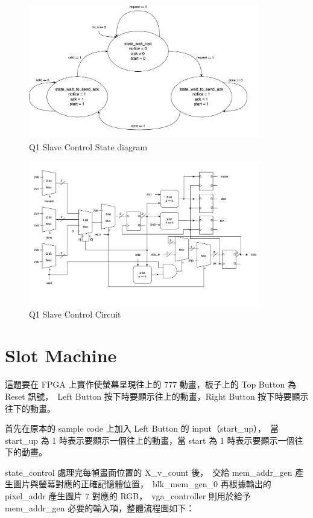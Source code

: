 \documentclass[10.5pt,compsoc,UTF8]{CjC}
\theoremstyle{mystyle}
\begin{document}
\begin{figure}[!h]
  \centering
  \includegraphics[width=0.9\textwidth]{./img/c2c-2.png}
  \caption{Q1 Slave Control State diagram}
  \label{fig:c2c-2}
\end{figure}

\begin{figure}[!h]
  \centering
  \includegraphics[width=0.9\textwidth]{./img/c2c-3.png}
  \caption{Q1 Slave Control Circuit}
  \label{fig:c2c-3}
\end{figure}

\newpage
\section{Slot Machine}

這題要在 FPGA 上實作使螢幕呈現往上的 777 動畫，板子上的 Top Button 為 Reset 訊號，\
Left Button 按下時要顯示往上的動畫，Right Button 按下時要顯示往下的動畫。

首先在原本的 sample code 上加入 Left Button 的 input（start\_up），\
當 start\_up 為 1 時表示要顯示一個往上的動畫，當 start 為 1 時表示要顯示一個往下的動畫。
\par
state\_control 處理完每幀畫面位置的 X\_v\_count 後，\
交給 mem\_addr\_gen 產生圖片與螢幕對應的正確記憶體位置，\
blk\_mem\_gen\_0 再根據輸出的 pixel\_addr 產生圖片 7 對應的 RGB，\
vga\_controller 則用於給予 mem\_addr\_gen 必要的輸入項，整體流程圖如下：
\end{document}
